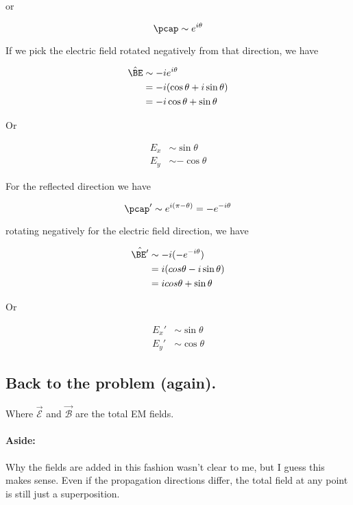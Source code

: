 or

\begin{equation}\label{eqn:relativisticElectrodynamicsT9:540}
\pcap \sim e^{i\theta}
\end{equation}

If we pick the electric field rotated negatively from that direction, we have

\begin{align*}
\hat{\BE} 
&\sim -i e^{i \theta} \\
&= -i (\cos\theta + i \sin\theta) \\
&= -i \cos\theta + \sin\theta
\end{align*}

Or

\begin{align}\label{eqn:relativisticElectrodynamicsT9:560}
E_x &\sim \sin\theta \\
E_y &\sim -\cos\theta
\end{align}

For the reflected direction we have

\begin{equation}\label{eqn:relativisticElectrodynamicsT9:580}
\pcap' \sim e^{i (\pi - \theta)} = - e^{-i \theta}
\end{equation}

rotating negatively for the electric field direction, we have

\begin{align*}
\hat{\BE'} 
&\sim -i (- e^{-i\theta} ) \\
&= i(cos\theta - i\sin\theta) \\
&= i cos\theta + \sin\theta
\end{align*}

Or

\begin{align}\label{eqn:relativisticElectrodynamicsT9:600}
E_x' &\sim \sin\theta \\
E_y' &\sim \cos\theta 
\end{align}

\subsection{Back to the problem (again).}

Where $\vec{\mathcal{E}}$ and $\vec{\mathcal{B}}$ are the total EM fields.

\paragraph{Aside:} Why the fields are added in this fashion wasn't clear to me, but I guess this makes sense.  Even if the propagation directions differ, the total field at any point is still just a superposition.

